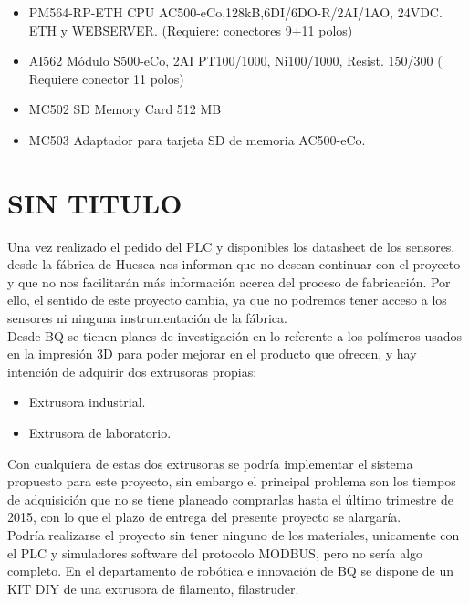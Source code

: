 \begin{itemize}
	\item{PM564-RP-ETH CPU AC500-eCo,128kB,6DI/6DO-R/2AI/1AO, 24VDC. ETH y WEBSERVER. (Requiere: conectores 9+11 polos)}
	\item{AI562 Módulo S500-eCo, 2AI PT100/1000, Ni100/1000, Resist. 150/300 ( Requiere conector 11 polos)}
	\item{MC502 SD Memory Card 512 MB}
	\item{MC503 Adaptador para tarjeta SD de memoria AC500-eCo.}
\end{itemize}

\section{SIN TITULO}
\label{}

Una vez realizado el pedido del PLC y disponibles los datasheet de los sensores, desde la fábrica de Huesca nos informan que no desean continuar con el proyecto y que no nos facilitarán más información acerca del proceso de fabricación. Por ello, el sentido de este proyecto cambia, ya que no podremos tener acceso a los sensores ni ninguna instrumentación de la fábrica.\\

Desde BQ se tienen planes de investigación en lo referente a los polímeros usados en la impresión 3D para poder mejorar en el producto que ofrecen, y hay intención de adquirir dos extrusoras propias:

\begin{itemize}
		\item{Extrusora industrial.}
		\item{Extrusora de laboratorio.}
\end{itemize}

Con cualquiera de estas dos extrusoras se podría implementar el sistema propuesto para este proyecto, sin embargo el principal problema son los tiempos de adquisición que no se tiene planeado comprarlas hasta el último trimestre de 2015, con lo que el plazo de entrega del presente proyecto se alargaría.\\

Podría realizarse el proyecto sin tener ninguno de los materiales, unicamente con el PLC y simuladores software del protocolo MODBUS, pero no sería algo completo. En el departamento de robótica e innovación de BQ se dispone de un KIT DIY de una extrusora de filamento, filastruder.\\

